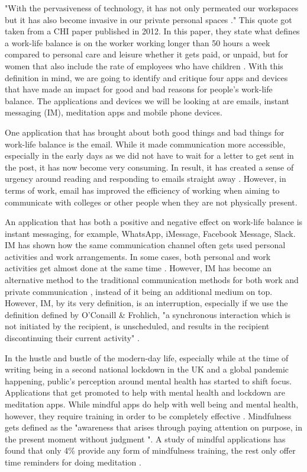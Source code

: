 \documentclass{sigchi}
\begin{document}
	"With the pervasiveness of technology, it has not only permeated our workspaces but it has also become invasive in our private personal spaces \cite{peters2012sig}." This quote got taken from a CHI paper published in 2012. In this paper, they state what defines a work-life balance is on the worker working longer than 50 hours a week compared to personal care and leisure whether it gets paid, or unpaid, but for women that also include the rate of employees who have children \cite{peters2012sig}. With this definition in mind, we are going to identify and critique four apps and devices that have made an impact for good and bad reasons for people's work-life balance. The applications and devices we will be looking at are emails, instant messaging (IM), meditation apps and mobile phone devices.
	
	One application that has brought about both good things and bad things for work-life balance is the email. While it made communication more accessible, especially in the early days as we did not have to wait for a letter to get sent in the post, it has now become very consuming. In result, it has created a sense of urgency around reading and responding to emails straight away \cite{stawarz2013d}. However, in terms of work, email has improved the efficiency of working when aiming to communicate with colleges or other people when they are not physically present.
	
	An application that has both a positive and negative effect on work-life balance is instant messaging, for example, WhatsApp, iMessage, Facebook Message, Slack. IM has shown how the same communication channel often gets used personal activities and work arrangements. In some cases, both personal and work activities get almost done at the same time \cite{lindley2012s}. However, IM has become an alternative method to the traditional communication methods for both work \cite{siggroup2005group} and private communication \cite{flanagin2005online}, instead of it being an additional medium on top. However, IM, by its very definition, is an interruption, especially if we use the definition defined by O'Conaill \& Frohlich, "a synchronous interaction which is not initiated by the recipient, is unscheduled, and results in the recipient discontinuing their current activity" \cite{rennecker2003theorizing}. 
	
	In the hustle and bustle of the modern-day life, especially while at the time of writing being in a second national lockdown in the UK and a global pandemic happening, public's perception around mental health has started to shift focus. Applications that get promoted to help with mental health and lockdown are meditation apps. While mindful apps do help with well being and mental health, however, they require training in order to be completely effective \cite{dauden2018evaluating}.  Mindfulness gets defined as the "awareness that arises through paying attention on purpose, in the present moment without judgment \cite{baer2003mindfulness}". A study of mindful applications has found that only 4\% provide any form of mindfulness training, the rest only offer time reminders for doing meditation \cite{mani2015review}. 
	
\end{document}

